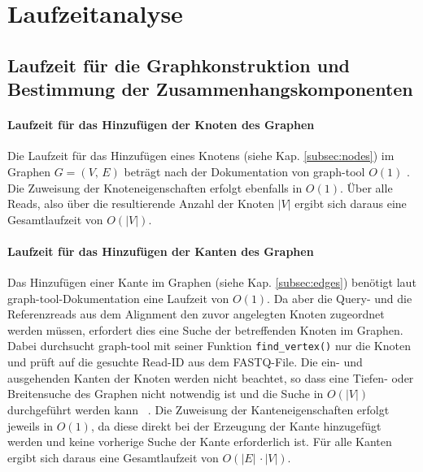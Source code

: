 \chapter{Laufzeitanalyse} \label{sec:}

\section{Laufzeit für die Graphkonstruktion und Bestimmung der Zusammenhangskomponenten} \label{sec:}
\subsubsection{Laufzeit für das Hinzufügen der Knoten des Graphen} \label{subsec:}
Die Laufzeit für das Hinzufügen eines Knotens (siehe Kap. \ref{subsec:nodes}) im Graphen $G=(V, \, E)$ beträgt nach der Dokumentation von graph-tool  $ O(1) $ \cite{docs_graph_tool}. Die Zuweisung der Knoteneigenschaften erfolgt ebenfalls in $ O(1) $. Über alle Reads, also über die resultierende Anzahl der Knoten $ |V| $ ergibt sich daraus eine Gesamtlaufzeit von $ O(|V|) $.\\

\subsubsection{Laufzeit für das Hinzufügen der Kanten des Graphen} \label{subsec:}

Das Hinzufügen einer Kante im Graphen (siehe Kap. \ref{subsec:edges}) benötigt laut graph-tool-Dokumentation \cite{docs_graph_tool} eine Laufzeit von $ O(1) $. Da aber die Query- und die Referenzreads aus dem Alignment den zuvor angelegten Knoten zugeordnet werden müssen, erfordert dies eine Suche der betreffenden Knoten im Graphen. Dabei durchsucht graph-tool mit seiner Funktion \lstinline|find_vertex()| nur die Knoten und prüft auf die gesuchte Read-ID aus dem FASTQ-File. Die ein- und ausgehenden Kanten der Knoten werden nicht beachtet, so dass eine Tiefen- oder Breitensuche des Graphen nicht notwendig ist und die Suche in $ O(|V|) $ durchgeführt werden kann ~\cite{graph_tool_coplexity_find_vertex}. Die Zuweisung der Kanteneigenschaften erfolgt jeweils in $ O(1) $, da diese direkt bei der Erzeugung der Kante hinzugefügt werden und keine vorherige Suche der Kante erforderlich ist. Für alle Kanten ergibt sich daraus eine Gesamtlaufzeit von $ O(|E|\, \cdotp |V|) $. \\


